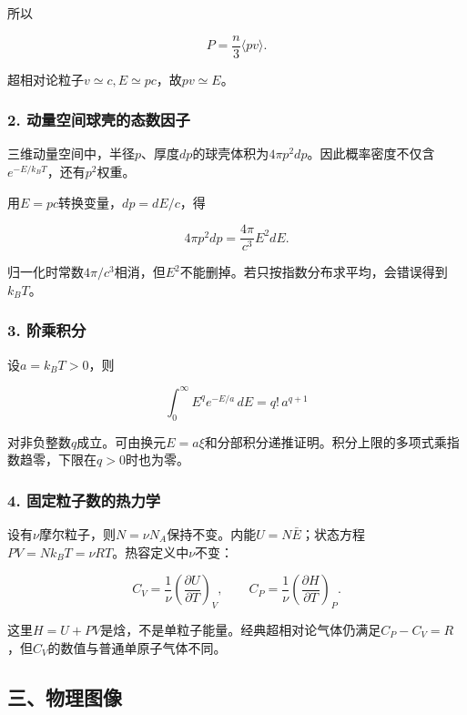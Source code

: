 \documentclass[12pt,a4paper,fontset=fandol]{ctexart}
\begin{document}
所以

\[
P=\frac n3\langle pv\rangle.
\]

超相对论粒子\(v\simeq c,E\simeq pc\)，故\(pv\simeq E\)。

\subsubsection{2.
动量空间球壳的态数因子}\label{ux52a8ux91cfux7a7aux95f4ux7403ux58f3ux7684ux6001ux6570ux56e0ux5b50}

三维动量空间中，半径\(p\)、厚度\(dp\)的球壳体积为\(4\pi p^2dp\)。因此概率密度不仅含\(e^{-E/k_BT}\)，还有\(p^2\)权重。

用\(E=pc\)转换变量，\(dp=dE/c\)，得

\[
4\pi p^2dp=\frac{4\pi}{c^3}E^2dE.
\]

归一化时常数\(4\pi/c^3\)相消，但\(E^2\)不能删掉。若只按指数分布求平均，会错误得到\(k_BT\)。

\subsubsection{3. 阶乘积分}\label{ux9636ux4e58ux79efux5206}

设\(a=k_BT>0\)，则

\[
\int_0^\infty E^q e^{-E/a}\,dE=q!\,a^{q+1}
\]

对非负整数\(q\)成立。可由换元\(E=a\xi\)和分部积分递推证明。积分上限的多项式乘指数趋零，下限在\(q>0\)时也为零。

\subsubsection{4.
固定粒子数的热力学}\label{ux56faux5b9aux7c92ux5b50ux6570ux7684ux70edux529bux5b66}

设有\(\nu\)摩尔粒子，则\(N=\nu N_A\)保持不变。内能\(U=N\bar E\)；状态方程\(PV=Nk_BT=\nu RT\)。热容定义中\(\nu\)不变：

\[
C_V=\frac1\nu\left(\frac{\partial U}{\partial T}\right)_V,
\qquad
C_P=\frac1\nu\left(\frac{\partial H}{\partial T}\right)_P.
\]

这里\(H=U+PV\)是焓，不是单粒子能量。经典超相对论气体仍满足\(C_P-C_V=R\)，但\(C_V\)的数值与普通单原子气体不同。

\subsection{三、物理图像}\label{ux4e09ux7269ux7406ux56feux50cf-6}
\end{document}
